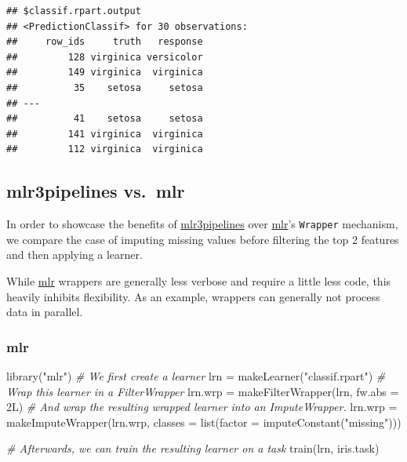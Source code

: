 \documentclass[
]{scrbook}
\newenvironment{Shaded}{\begin{snugshade}}{\end{snugshade}}
\newcommand{\AttributeTok}[1]{\textcolor[rgb]{0.77,0.63,0.00}{#1}}
\newcommand{\CommentTok}[1]{\textcolor[rgb]{0.56,0.35,0.01}{\textit{#1}}}
\newcommand{\FunctionTok}[1]{\textcolor[rgb]{0.00,0.00,0.00}{#1}}
\newcommand{\NormalTok}[1]{#1}
\newcommand{\OtherTok}[1]{\textcolor[rgb]{0.56,0.35,0.01}{#1}}
\newcommand{\StringTok}[1]{\textcolor[rgb]{0.31,0.60,0.02}{#1}}
\renewenvironment{Shaded} {\begin{snugshade}\small} {\end{snugshade}}
\begin{document}
\begin{verbatim}
## $classif.rpart.output
## <PredictionClassif> for 30 observations:
##     row_ids     truth   response
##         128 virginica versicolor
##         149 virginica  virginica
##          35    setosa     setosa
## ---                             
##          41    setosa     setosa
##         141 virginica  virginica
##         112 virginica  virginica
\end{verbatim}

\hypertarget{mlr3pipelines-vs.-mlr}{%
\subsection{mlr3pipelines vs.~mlr}\label{mlr3pipelines-vs.-mlr}}

In order to showcase the benefits of \href{https://cran.r-project.org/package=mlr3pipelines}{mlr3pipelines} over \href{https://cran.r-project.org/package=mlr}{mlr}'s \texttt{Wrapper} mechanism, we compare the case of imputing missing values before filtering the top 2 features and then applying a learner.

While \href{https://cran.r-project.org/package=mlr}{mlr} wrappers are generally less verbose and require a little less code, this heavily inhibits flexibility.
As an example, wrappers can generally not process data in parallel.

\hypertarget{mlr}{%
\subsubsection{mlr}\label{mlr}}

\begin{Shaded}
\begin{Highlighting}[]
\FunctionTok{library}\NormalTok{(}\StringTok{"mlr"}\NormalTok{)}
\CommentTok{\# We first create a learner}
\NormalTok{lrn }\OtherTok{=} \FunctionTok{makeLearner}\NormalTok{(}\StringTok{"classif.rpart"}\NormalTok{)}
\CommentTok{\# Wrap this learner in a FilterWrapper}
\NormalTok{lrn.wrp }\OtherTok{=} \FunctionTok{makeFilterWrapper}\NormalTok{(lrn, }\AttributeTok{fw.abs =}\NormalTok{ 2L)}
\CommentTok{\# And wrap the resulting wrapped learner into an ImputeWrapper.}
\NormalTok{lrn.wrp }\OtherTok{=} \FunctionTok{makeImputeWrapper}\NormalTok{(lrn.wrp, }\AttributeTok{classes =} \FunctionTok{list}\NormalTok{(}\AttributeTok{factor =} \FunctionTok{imputeConstant}\NormalTok{(}\StringTok{"missing"}\NormalTok{)))}

\CommentTok{\# Afterwards, we can train the resulting learner on a task}
\FunctionTok{train}\NormalTok{(lrn, iris.task)}
\end{Highlighting}
\end{Shaded}
\end{document}
